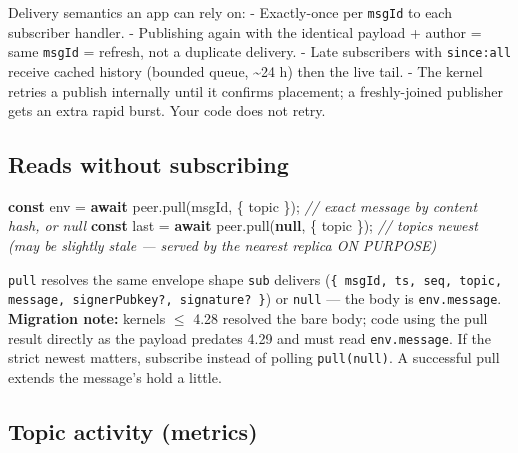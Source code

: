 \documentclass[
  nobib]{tufte-handout}
\newenvironment{Shaded}{}{}
\newcommand{\CommentTok}[1]{\textcolor[rgb]{0.38,0.63,0.69}{\textit{#1}}}
\newcommand{\ControlFlowTok}[1]{\textcolor[rgb]{0.00,0.44,0.13}{\textbf{#1}}}
\newcommand{\FunctionTok}[1]{\textcolor[rgb]{0.02,0.16,0.49}{#1}}
\newcommand{\KeywordTok}[1]{\textcolor[rgb]{0.00,0.44,0.13}{\textbf{#1}}}
\newcommand{\NormalTok}[1]{#1}
\newcommand{\OperatorTok}[1]{\textcolor[rgb]{0.40,0.40,0.40}{#1}}
\begin{document}
Delivery semantics an app can rely on: - Exactly-once per \texttt{msgId}
to each subscriber handler. - Publishing again with the identical
payload + author = same \texttt{msgId} = refresh, not a duplicate
delivery. - Late subscribers with
\texttt{since:\textquotesingle{}all\textquotesingle{}} receive cached
history (bounded queue, \textasciitilde24 h) then the live tail. - The
kernel retries a publish internally until it confirms placement; a
freshly-joined publisher gets an extra rapid burst. Your code does not
retry.

\subsection{Reads without subscribing}\label{reads-without-subscribing}

\begin{Shaded}
\begin{Highlighting}[]
\KeywordTok{const}\NormalTok{ env  }\OperatorTok{=} \ControlFlowTok{await}\NormalTok{ peer}\OperatorTok{.}\FunctionTok{pull}\NormalTok{(msgId}\OperatorTok{,}\NormalTok{ \{ topic \})}\OperatorTok{;}        \CommentTok{// exact message by content hash, or null}
\KeywordTok{const}\NormalTok{ last }\OperatorTok{=} \ControlFlowTok{await}\NormalTok{ peer}\OperatorTok{.}\FunctionTok{pull}\NormalTok{(}\KeywordTok{null}\OperatorTok{,}\NormalTok{  \{ topic \})}\OperatorTok{;}        \CommentTok{// topic\textquotesingle{}s newest (may be slightly stale — served by the nearest replica ON PURPOSE)}
\end{Highlighting}
\end{Shaded}

\texttt{pull} resolves the same envelope shape \texttt{sub} delivers
(\texttt{\{ msgId, ts, seq, topic, message, signerPubkey?, signature? \}})
or \texttt{null} — the body is \texttt{env.message}. \textbf{Migration
note:} kernels $\le$ 4.28 resolved the bare body; code using the pull
result directly as the payload predates 4.29 and must read
\texttt{env.message}. If the strict newest matters, subscribe instead of
polling \texttt{pull(null)}. A successful pull extends the message's hold
a little.

\subsection{Topic activity (metrics)}\label{topic-activity-metrics}
\end{document}
